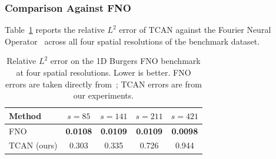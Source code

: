 \begin{table}[h!]
\centering
{}
\caption{TCAN evaluation metrics with formulas, purposes, and thresholds.}
\label{tab:model-metrics}
\end{table}

\subsubsection{Comparison Against FNO}

Table~\ref{tab:tcan-vs-fno} reports the relative $L^2$ error of TCAN against the Fourier Neural Operator~\cite{li2021fourier} across all four spatial resolutions of the benchmark dataset.

\begin{table}[h!]
\centering
\begin{tabular}{lcccc}
\toprule
\textbf{Method} & $s=85$ & $s=141$ & $s=211$ & $s=421$ \\
\midrule
FNO~\cite{li2021fourier} & \textbf{0.0108} & \textbf{0.0109} & \textbf{0.0109} & \textbf{0.0098} \\
TCAN (ours)              & 0.303  & 0.335  & 0.726  & 0.944  \\
\bottomrule
\end{tabular}
\caption{Relative $L^2$ error on the 1D Burgers FNO benchmark at four spatial resolutions. Lower is better. FNO errors are taken directly from~\cite{li2021fourier}; TCAN errors are from our experiments.}
\label{tab:tcan-vs-fno}
\end{table}

